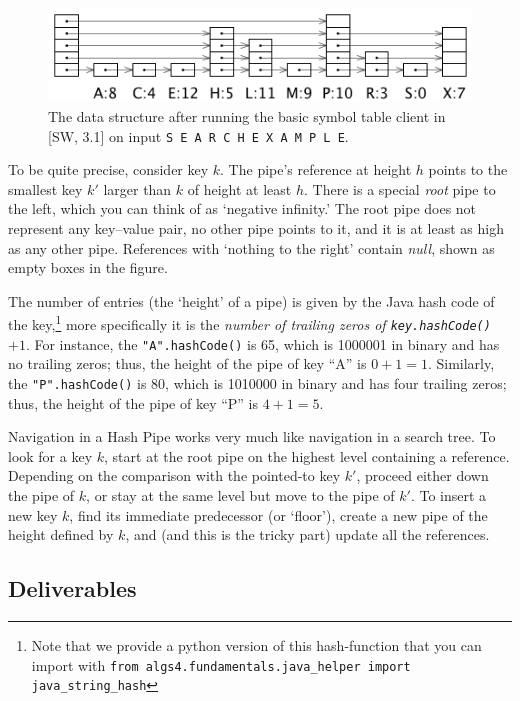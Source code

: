 \documentclass{tufte-handout}
\begin{document}
\begin{figure}
  \includegraphics[width=\textwidth]{img/full.png}
  \caption{The data structure after running the basic symbol table client in [SW, 3.1] on input {\tt S E A R C H E X A M P L E}.}
\end{figure}

To be quite precise, consider key $k$.
The pipe's reference at height $h$ points to the smallest key $k'$ larger than $k$ of height at least $h$.
There is a special \emph{root} pipe to the left, which you can think of as `negative infinity.' 
The root pipe does not represent any key--value pair, no other pipe points to it, and it is at least as high as any other pipe.
References with `nothing to the right' contain \emph{null}, shown as empty boxes in the figure.

The number of entries (the `height' of a pipe) is given by the Java hash code of the key,\footnote{Note that we provide a python version of this hash-function that you can import with \texttt{from algs4.fundamentals.java\_helper import java\_string\_hash}}
more specifically it is the \emph{number of trailing zeros of {\tt key.hashCode()} $+1$}.
For instance, the {\tt "A".hashCode()} is 65, which is 1000001 in binary and has no trailing zeros; thus, the height of the pipe of key ``A'' is $0+1=1$.
Similarly, the {\tt "P".hashCode()} is 80, which is 1010000 in binary and has four trailing zeros; thus, the height of the pipe of key ``P'' is $4+1=5$.

Navigation in a Hash Pipe works very much like navigation in a search tree.
To look for a key $k$, start at the root pipe on the highest level containing a reference.
Depending on the comparison with the pointed-to key $k'$, proceed either down the pipe of $k$, or stay at the same level but move to the pipe of $k'$.
To insert a new key $k$, find its immediate predecessor (or `floor'), create a new pipe of the height defined by $k$, and (and this is the tricky part) update all the references.

\subsection{Deliverables}
\end{document}
